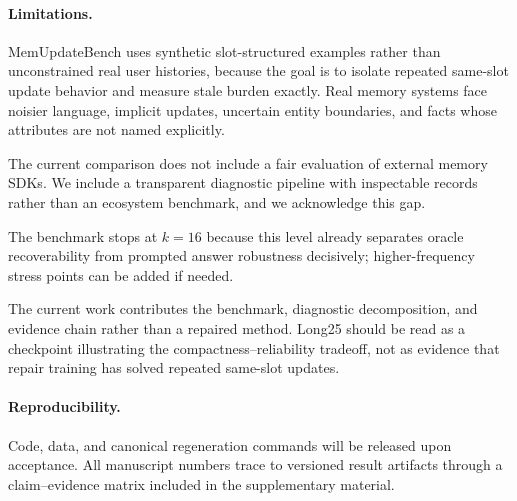 \documentclass[11pt,twocolumn]{article}
\begin{document}
\paragraph{Limitations.}
MemUpdateBench uses synthetic slot-structured examples rather than unconstrained real user histories, because the goal is to isolate repeated same-slot update behavior and measure stale burden exactly.
Real memory systems face noisier language, implicit updates, uncertain entity boundaries, and facts whose attributes are not named explicitly.

The current comparison does not include a fair evaluation of external memory SDKs.
We include a transparent diagnostic pipeline with inspectable records rather than an ecosystem benchmark, and we acknowledge this gap.

The benchmark stops at \(k{=}16\) because this level already separates oracle recoverability from prompted answer robustness decisively; higher-frequency stress points can be added if needed.

The current work contributes the benchmark, diagnostic decomposition, and evidence chain rather than a repaired method.
Long25 should be read as a checkpoint illustrating the compactness--reliability tradeoff, not as evidence that repair training has solved repeated same-slot updates.

\paragraph{Reproducibility.}
Code, data, and canonical regeneration commands will be released upon acceptance.
All manuscript numbers trace to versioned result artifacts through a claim--evidence matrix included in the supplementary material.



\end{document}
